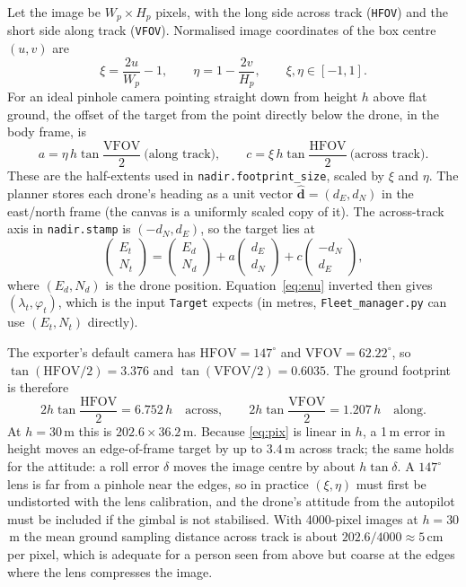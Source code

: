\documentclass[11pt,a4paper]{article}
\newcommand{\code}[1]{\texttt{#1}}
\newcommand{\HFOV}{\mathrm{HFOV}}
\newcommand{\VFOV}{\mathrm{VFOV}}
\begin{document}
Let the image be $W_p\times H_p$ pixels, with the long side across track (\code{HFOV}) and the short side
along track (\code{VFOV}). Normalised image coordinates of the box centre $(u,v)$ are
\begin{equation}
\xi = \frac{2u}{W_p}-1,\qquad \eta = 1-\frac{2v}{H_p}, \qquad \xi,\eta\in[-1,1].
\end{equation}
For an ideal pinhole camera pointing straight down from height $h$ above flat ground, the offset of the
target from the point directly below the drone, in the body frame, is
\begin{equation}
a = \eta\, h\tan\frac{\VFOV}{2}\ \text{(along track)},\qquad
c = \xi\, h\tan\frac{\HFOV}{2}\ \text{(across track)}.
\label{eq:pix}
\end{equation}
These are the half-extents used in \code{nadir.footprint\_size}, scaled by $\xi$ and $\eta$. The planner
stores each drone's heading as a unit vector $\hat{\mathbf{d}} = (d_E, d_N)$ in the east/north frame (the
canvas is a uniformly scaled copy of it). The across-track axis in \code{nadir.stamp} is
$(-d_N, d_E)$, so the target lies at
\begin{equation}
\begin{pmatrix} E_t\\ N_t \end{pmatrix} =
\begin{pmatrix} E_d\\ N_d \end{pmatrix} + a\begin{pmatrix} d_E\\ d_N \end{pmatrix}
+ c\begin{pmatrix} -d_N\\ d_E \end{pmatrix},
\label{eq:geo}
\end{equation}
where $(E_d,N_d)$ is the drone position. Equation~\eqref{eq:enu} inverted then gives
$(\lambda_t,\varphi_t)$, which is the input \code{Target} expects (in metres, \code{Fleet\_manager.py} can
use $(E_t, N_t)$ directly).

The exporter's default camera has $\HFOV = 147^\circ$ and $\VFOV = 62.22^\circ$, so
$\tan(\HFOV/2) = 3.376$ and $\tan(\VFOV/2) = 0.6035$. The ground footprint is therefore
\begin{equation}
2h\tan\frac{\HFOV}{2} = 6.752\,h \quad\text{across},\qquad 2h\tan\frac{\VFOV}{2} = 1.207\,h \quad\text{along}.
\end{equation}
At $h = 30$\,m this is $202.6\times36.2$\,m. Because \eqref{eq:pix} is linear in $h$, a 1\,m error in height
moves an edge-of-frame target by up to $3.4$\,m across track; the same holds for the attitude: a roll error
$\delta$ moves the image centre by about $h\tan\delta$. A $147^\circ$ lens is far from a pinhole near the
edges, so in practice $(\xi,\eta)$ must first be undistorted with the lens calibration, and the drone's
attitude from the autopilot must be included if the gimbal is not stabilised. With 4000-pixel images at
$h=30$\,m the mean ground sampling distance across track is about $202.6/4000 \approx 5$\,cm per pixel,
which is adequate for a person seen from above but coarse at the edges where the lens compresses the image.
\end{document}
